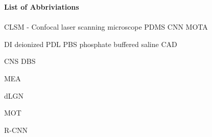 \Large{\textbf{List of Abbriviations}} \\ \\

\normalsize
CLSM  -  Confocal laser scanning microscope
PDMS
CNN
MOTA

DI deionized
PDL
PBS phosphate buffered saline
CAD

CNS
DBS

MEA

dLGN

MOT

R-CNN